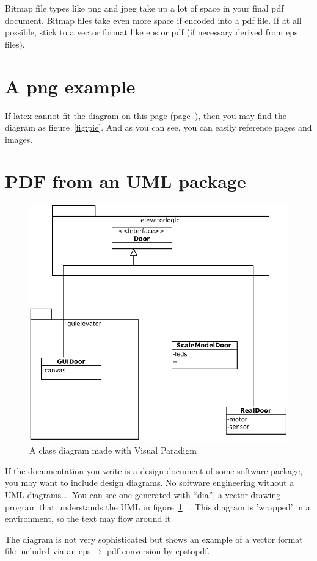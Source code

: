Bitmap file types like png and jpeg take up a lot of space in your
final pdf document. 
Bitmap files take even more space if encoded into a pdf file.
If at all possible, stick to a vector format like eps or pdf (if
necessary derived from eps files). 


\section{A png example}
\label{page:pngexample}
If latex cannot fit the diagram on this page
(page~\pageref{page:pngexample}), 
 then you may find the diagram as figure~\vref{fig:pie}. And as you
 can see, you can easily reference pages and images.

\section{PDF from an UML package} 
\begin{figure}

  \includegraphics[width=.4\textwidth]{images/doorsystem.pdf}
  \caption{A class diagram made with Visual Paradigm}
  \label{fig:classdiagram}
\end{figure}
If the documentation you write is a design document of some software
package, you may want to include design diagrams.
No software engineering without a UML diagrams\ldots.
You can see one generated with ``dia'', a vector drawing program that
understands the UML in figure~\ref{fig:classdiagram}
~. This diagram is 'wrapped' in a  environment, so the text may flow around it

The diagram is not very sophisticated but shows an example of a vector
format file included via an eps$\rightarrow$ pdf conversion by
epstopdf.

